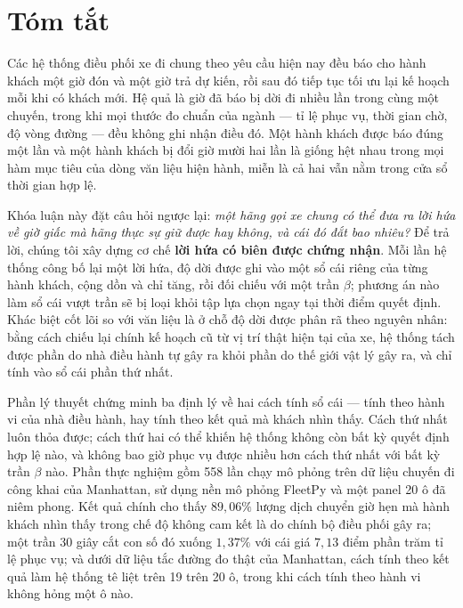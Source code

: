 \chapter*{Tóm tắt}

Các hệ thống điều phối xe đi chung theo yêu cầu hiện nay đều báo cho hành khách một giờ đón
và một giờ trả dự kiến, rồi sau đó tiếp tục tối ưu lại kế hoạch mỗi khi có khách mới. Hệ quả
là giờ đã báo bị dời đi nhiều lần trong cùng một chuyến, trong khi mọi thước đo chuẩn của
ngành --- tỉ lệ phục vụ, thời gian chờ, độ vòng đường --- đều không ghi nhận điều đó. Một
hành khách được báo đúng một lần và một hành khách bị đổi giờ mười hai lần là giống hệt nhau
trong mọi hàm mục tiêu của dòng văn liệu hiện hành, miễn là cả hai vẫn nằm trong cửa sổ thời
gian hợp lệ.

Khóa luận này đặt câu hỏi ngược lại: \emph{một hãng gọi xe chung có thể đưa ra lời hứa về giờ
giấc mà hãng thực sự giữ được hay không, và cái đó đắt bao nhiêu?} Để trả lời, chúng tôi xây
dựng cơ chế \textbf{lời hứa có biên được chứng nhận}. Mỗi lần hệ thống công bố lại một lời
hứa, độ dời được ghi vào một sổ cái riêng của từng hành khách, cộng dồn và chỉ tăng, rồi đối
chiếu với một trần $\beta$; phương án nào làm sổ cái vượt trần sẽ bị loại khỏi tập lựa chọn
ngay tại thời điểm quyết định. Khác biệt cốt lõi so với văn liệu là ở chỗ độ dời được phân rã
theo nguyên nhân: bằng cách chiếu lại chính kế hoạch cũ từ vị trí thật hiện tại của xe, hệ
thống tách được phần do nhà điều hành tự gây ra khỏi phần do thế giới vật lý gây ra, và chỉ
tính vào sổ cái phần thứ nhất.

Phần lý thuyết chứng minh ba định lý về hai cách tính sổ cái --- tính theo hành vi của nhà
điều hành, hay tính theo kết quả mà khách nhìn thấy. Cách thứ nhất luôn thỏa được; cách thứ
hai có thể khiến hệ thống không còn bất kỳ quyết định hợp lệ nào, và không bao giờ phục vụ
được nhiều hơn cách thứ nhất với bất kỳ trần $\beta$ nào. Phần thực nghiệm gồm 558 lần chạy
mô phỏng trên dữ liệu chuyến đi công khai của Manhattan, sử dụng nền mô phỏng FleetPy và một
panel 20 ô đã niêm phong. Kết quả chính cho thấy $89{,}06\%$ lượng dịch chuyển giờ hẹn mà hành
khách nhìn thấy trong chế độ không cam kết là do chính bộ điều phối gây ra; một trần 30 giây
cắt con số đó xuống $1{,}37\%$ với cái giá $7{,}13$ điểm phần trăm tỉ lệ phục vụ; và dưới dữ
liệu tắc đường đo thật của Manhattan, cách tính theo kết quả làm hệ thống tê liệt trên 19 trên
20 ô, trong khi cách tính theo hành vi không hỏng một ô nào.

